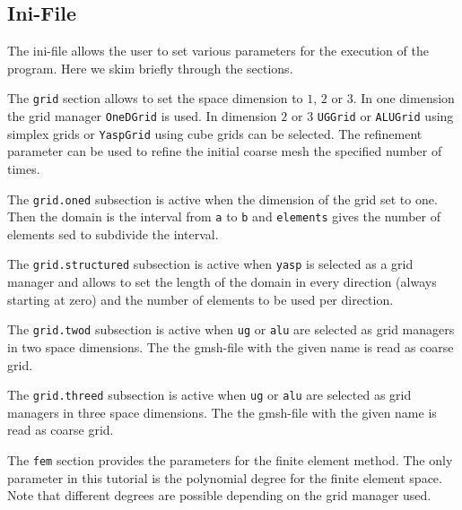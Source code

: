 \documentclass[a4paper,12pt]{article}
\begin{document}
\subsection{Ini-File}

The ini-file allows the user to set various parameters for the
execution of the program. Here we skim briefly through the sections.


The \lstinline{grid} section allows to set the space dimension to $1$, $2$ or $3$.
In one dimension the grid manager \lstinline{OneDGrid} is used.
In dimension $2$ or $3$ \lstinline{UGGrid} or \lstinline{ALUGrid}
using simplex grids or \lstinline{YaspGrid} using cube grids can be selected.
The refinement parameter can be used to refine the initial coarse
mesh the specified number of times.


The \lstinline{grid.oned} subsection is active when the dimension
of the grid set to one. Then the domain is the interval from \lstinline{a}
to \lstinline{b} and \lstinline{elements} gives the number of elements
sed to subdivide the interval.


The \lstinline{grid.structured} subsection is active when \lstinline{yasp}
is selected as a grid manager and allows to set the length of the domain
in every direction (always starting at zero) and the number of elements
to be used per direction.


The \lstinline{grid.twod} subsection is active when \lstinline{ug}
or \lstinline{alu} are selected as grid managers in two space dimensions.
The the gmsh-file with the given name is read as coarse grid.


The \lstinline{grid.threed} subsection is active when \lstinline{ug}
or \lstinline{alu} are selected as grid managers in three space dimensions.
The the gmsh-file with the given name is read as coarse grid.


The \lstinline{fem} section provides the parameters for the finite
element method. The only parameter in this tutorial is the polynomial
degree for the finite element space. Note that different degrees
are possible depending on the grid manager used.
\end{document}
